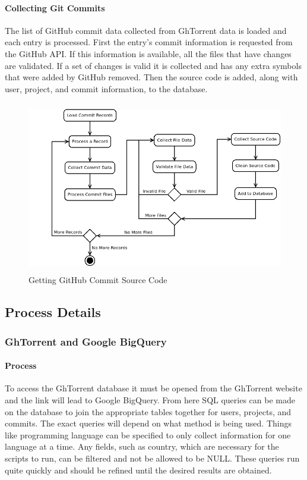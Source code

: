 \documentclass{article}
\begin{document}
\paragraph{Collecting Git Commits}
The list of GitHub commit data collected from GhTorrent data is loaded and each entry is processed. First the entry's commit information is requested from the GitHub API. If this information is available, all the files that have changes are validated. If a set of changes is valid it is collected and has any extra symbols that were added by GitHub removed. Then the source code is added, along with user, project, and commit information, to the database.

\begin{figure}[!h]
    \centering
    \includegraphics[height=7.5cm]{diagrams/commits.png}
    \caption{Getting GitHub Commit Source Code}
\end{figure}


\subsection{Process Details}

\subsubsection{GhTorrent and Google BigQuery}

\paragraph{Process}
To access the GhTorrent database it must be opened from the GhTorrent website and the link will lead to Google BigQuery. From here SQL queries can be made on the database to join the appropriate tables together for users, projects, and commits. The exact queries will depend on what method is being used. Things like programming language can be specified to only collect information for one language at a time. Any fields, such as country, which are necessary for the scripts to run, can be filtered and not be allowed to be NULL. These queries run quite quickly and should be refined until the desired results are obtained.
\end{document}
